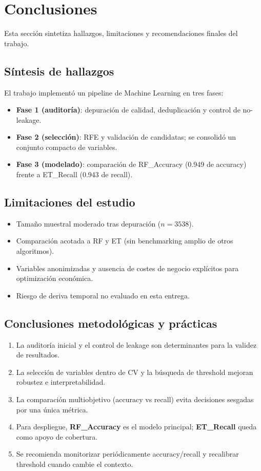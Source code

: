 \section{Conclusiones}

Esta sección sintetiza hallazgos, limitaciones y recomendaciones finales del trabajo.

\subsection{Síntesis de hallazgos}

El trabajo implementó un pipeline de Machine Learning en tres fases:

\begin{itemize}
  \item \textbf{Fase 1 (auditoría)}: depuración de calidad, deduplicación y control de no-leakage.
  \item \textbf{Fase 2 (selección)}: RFE y validación de candidatas; se consolidó un conjunto compacto de variables.
  \item \textbf{Fase 3 (modelado)}: comparación de RF\_Accuracy (0.949 de accuracy) frente a ET\_Recall (0.943 de recall).
\end{itemize}

\subsection{Limitaciones del estudio}

\begin{itemize}
  \item Tamaño muestral moderado tras depuración ($n=3538$).
  \item Comparación acotada a RF y ET (sin benchmarking amplio de otros algoritmos).
  \item Variables anonimizadas y ausencia de costes de negocio explícitos para optimización económica.
  \item Riesgo de deriva temporal no evaluado en esta entrega.
\end{itemize}

\subsection{Conclusiones metodológicas y prácticas}

\begin{enumerate}
  \item La auditoría inicial y el control de leakage son determinantes para la validez de resultados.
  \item La selección de variables dentro de CV y la búsqueda de threshold mejoran robustez e interpretabilidad.
  \item La comparación multiobjetivo (accuracy vs recall) evita decisiones sesgadas por una única métrica.
  \item Para despliegue, \textbf{RF\_Accuracy} es el modelo principal; \textbf{ET\_Recall} queda como apoyo de cobertura.
  \item Se recomienda monitorizar periódicamente accuracy/recall y recalibrar threshold cuando cambie el contexto.
\end{enumerate}

